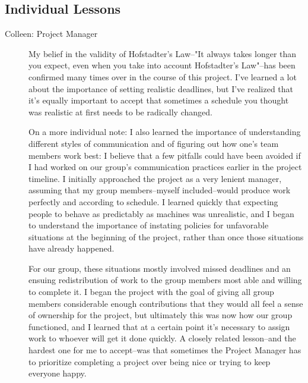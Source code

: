 \subsection{Individual Lessons}
\begin{description}
\item[Colleen: Project Manager] My belief in the validity of
  Hofstadter's Law--"It always takes longer than you expect, even when
  you take into account Hofstadter's Law"--has been confirmed many
  times over in the course of this project. I've learned a lot about
  the importance of setting realistic deadlines, but I've realized
  that it's equally important to accept that sometimes a schedule you
  thought was realistic at first needs to be radically changed.

  On a more individual note: I also learned the importance of understanding
  different styles of communication and of figuring out how one's team
  members work best: I believe that a few pitfalls could have
  been avoided if I had worked on our group's communication practices
  earlier in the project timeline. I initially approached the project as
  a very lenient manager, assuming that my group members--myself
  included--would produce work perfectly and according to schedule. I
  learned quickly that expecting people to behave as predictably as
  machines was unrealistic, and I began to understand the importance
  of instating policies for unfavorable situations at the
  beginning of the project, rather than once those situations have
  already happened.

  For our group, these situations mostly involved missed deadlines and an
  ensuing redistribution of work to the group members most able and willing
  to complete it. I began the project with the goal of giving all
  group members considerable enough contributions that they would
  all feel a sense of ownership for the project, but ultimately this
  was now how our group functioned, and I learned that at a certain
  point it's necessary to assign work to whoever will get it done
  quickly. A closely related lesson--and the hardest one for me to
  accept--was that sometimes the Project Manager has to prioritize
  completing a project over being nice or trying to keep everyone happy.


\end{description}
